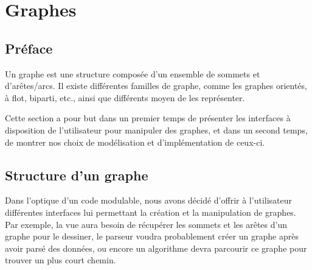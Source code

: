 \documentclass[french]{article}
\begin{document}
	\section{Graphes}
		\subsection{Préface}
		Un graphe est une structure composée d'un ensemble de sommets et d'arêtes/arcs. Il existe différentes familles de graphe, comme les graphes orientés, à flot, biparti, etc., ainsi que différents moyen de les représenter.
		
		Cette section a pour but dans un premier temps de présenter les interfaces à disposition de l'utilisateur pour manipuler des graphes, et dans un second temps, de montrer nos choix de modélisation et d'implémentation de ceux-ci.
		
		\subsection{Structure d'un graphe}
		Dans l'optique d'un code modulable, nous avons décidé d'offrir à l'utilisateur différentes interfaces lui permettant la création et la manipulation de graphes. Par exemple, la vue aura besoin de récupérer les sommets et les arêtes d'un graphe pour le dessiner, le parseur voudra probablement créer un graphe après avoir parsé des données, ou encore un algorithme devra parcourir ce graphe pour trouver un plus court chemin.
		
\end{document}
